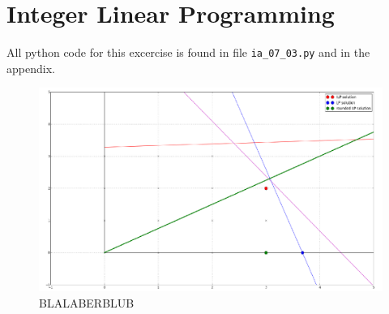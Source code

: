 \documentclass[11pt,a4paper]{scrartcl}
\begin{document}
\section{Integer Linear Programming}
All python code for this excercise is found in file \verb$ia_07_03.py$ and in the appendix. 
\begin{figure}[hb]
\includegraphics[width=.99\linewidth]{ex3_cut.png}
\caption{BLALABERBLUB}
\end{figure}

\clearpage
\appendix

\newpage

\end{document}
